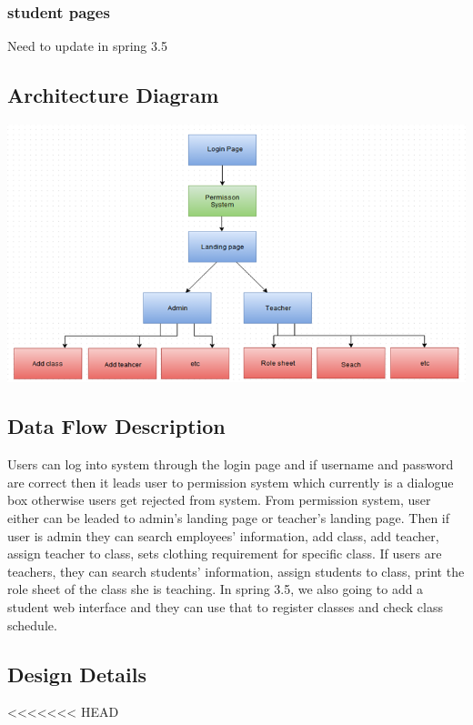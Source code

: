 \subsubsection{student pages}
Need to update in spring 3.5

\subsection{Architecture Diagram}
\includegraphics[scale=0.5]{pics/gui.png}\\

\subsection{Data Flow Description}
 Users can log into system through the login page and if username and password are correct then it leads user to permission system which currently is a dialogue box otherwise users get rejected from system. From permission system, user either can be leaded to admin's landing page or teacher's landing page. Then if user is admin they can search employees’ information, add class, add teacher, assign teacher to class, sets clothing requirement for specific class. If users are teachers, they can search students’ information, assign students to class, print the role sheet of the class she is teaching.
In spring 3.5, we also going to add a student web interface and they can use that to register classes and check class schedule. 

\subsection{Design Details}
<<<<<<< HEAD
